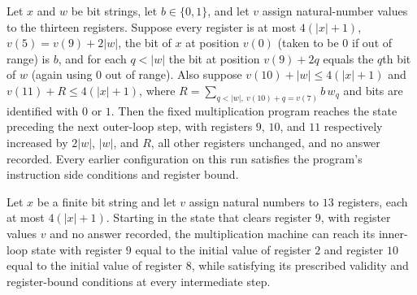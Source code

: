 \begin{lemma}
\label{Complexity.mult_inner_loop}
\leanok
{}
Let $x$ and $w$ be bit strings, let $b\in\{0,1\}$, and let $v$ assign natural-number
values to the thirteen registers. Suppose every register is at most $4(|x|+1)$,
$v(5)=v(9)+2|w|$, the bit of $x$ at position $v(0)$ (taken to be $0$ if out of range) is
$b$, and for each $q<|w|$ the bit at position $v(9)+2q$ equals the $q$th bit of $w$
(again using $0$ out of range). Also suppose $v(10)+|w|\le 4(|x|+1)$ and $v(11)+R\le
4(|x|+1)$, where $R=\sum_{q<|w|,\ v(10)+q=v(7)} b\,w_q$ and bits are identified with $0$
or $1$. Then the fixed multiplication program reaches the state preceding the next
outer-loop step, with registers $9$, $10$, and $11$ respectively increased by $2|w|$,
$|w|$, and $R$, all other registers unchanged, and no answer recorded. Every earlier
configuration on this run satisfies the program's instruction side conditions and
register bound.
\end{lemma}

\begin{lemma}
\label{Complexity.mult_row_start}
\leanok
{}
Let $x$ be a finite bit string and let $v$ assign natural numbers to $13$ registers,
each at most $4(|x|+1)$. Starting in the state that clears register $9$, with register
values $v$ and no answer recorded, the multiplication machine can reach its inner-loop
state with register $9$ equal to the initial value of register $2$ and register $10$
equal to the initial value of register $8$, while satisfying its prescribed validity and
register-bound conditions at every intermediate step.
\end{lemma}

